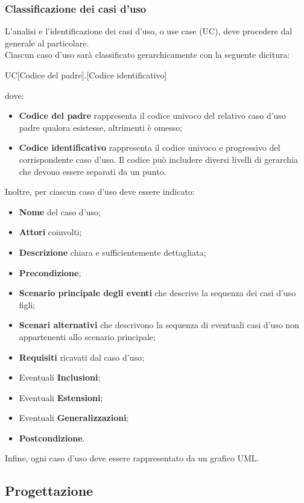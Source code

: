 \documentclass[../NormeDiProgetto.tex]{subfiles}
\begin{document}
			\subsubsection{Classificazione dei casi d'uso}
				L'analisi e l'identificazione dei casi d'uso, o use case (UC), deve
				procedere dal generale al particolare.\\
				Ciascun caso d'uso sarà classificato gerarchicamente con la seguente dicitura:
				\begin{center}
					UC[Codice del padre].[Codice identificativo]
				\end{center}
				dove:
				\begin{itemize}
					\item \textbf{Codice del padre} rappresenta il codice univoco
					del relativo caso d'uso padre qualora esistesse, altrimenti è omesso;
					\item \textbf{Codice identificativo} rappresenta il codice
					univoco e progressivo del corrispondente caso d'uso. Il codice
					può includere diversi livelli di gerarchia che devono essere
					separati da un punto.
				\end{itemize}
				Inoltre, per ciascun caso d'uso deve essere indicato:
				\begin{itemize}
					\item \textbf{Nome} del caso d'uso;
					\item \textbf{Attori} coinvolti;
					\item \textbf{Descrizione} chiara e sufficientemente
					dettagliata;
					\item \textbf{Precondizione};
					\item \textbf{Scenario principale degli eventi} che descrive
					la sequenza dei casi d'uso figli;
					\item \textbf{Scenari alternativi} che descrivono la sequenza
					di eventuali casi d'uso non appartenenti allo scenario
					principale;
					\item \textbf{Requisiti} ricavati dal caso d'uso;
					\item Eventuali \textbf{Inclusioni};
					\item Eventuali \textbf{Estensioni};
					\item Eventuali \textbf{Generalizzazioni};
					\item \textbf{Postcondizione}.
				\end{itemize}
				Infine, ogni caso d'uso deve essere rappresentato da un grafico UML.
		\subsection{Progettazione}
\end{document}
